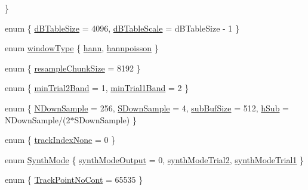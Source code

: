 \begin{DoxyCompactItemize}
 \}
\item 
enum \{ \hyperlink{namespace__sbsms___aa156b1bea560891fc580b9dca377bba0a8e2623f54fcf2f5a2d0552d731f6f146}{d\+B\+Table\+Size} = 4096, 
\hyperlink{namespace__sbsms___aa156b1bea560891fc580b9dca377bba0aac3733f2be1d01356fd6ada76bc62be0}{d\+B\+Table\+Scale} = d\+B\+Table\+Size -\/ 1
 \}
\item 
enum \hyperlink{namespace__sbsms___a62c9e6ed284aa8472274a48cccd777f1}{window\+Type} \{ \hyperlink{namespace__sbsms___a62c9e6ed284aa8472274a48cccd777f1a59da3b0b8fdeb25dac4eec9c53828d91}{hann}, 
\hyperlink{namespace__sbsms___a62c9e6ed284aa8472274a48cccd777f1ad5b7ad1b715cc9a6f75b8b74c4fe69a3}{hannpoisson}
 \}
\item 
enum \{ \hyperlink{namespace__sbsms___a63a4ac6396ce2a0b95d3fd234eb362fca71871c0b75ab2583bef18af369bd50a4}{resample\+Chunk\+Size} = 8192
 \}
\item 
enum \{ \hyperlink{namespace__sbsms___a79a0ca762d317030c29295cb20496a7da47f713a03ba9176eedce881edd4cdbdf}{min\+Trial2\+Band} = 1, 
\hyperlink{namespace__sbsms___a79a0ca762d317030c29295cb20496a7dad3d329f6ea1764f86f37427db90bdf46}{min\+Trial1\+Band} = 2
 \}
\item 
enum \{ \hyperlink{namespace__sbsms___a1074f2891e042ba40cfa1c793cee3e65a25ecb24fd92518a71a3eddc01338a887}{N\+Down\+Sample} = 256, 
\hyperlink{namespace__sbsms___a1074f2891e042ba40cfa1c793cee3e65ab0f9e22fc2bd4d17b42bd9b5ee84cc3f}{S\+Down\+Sample} = 4, 
\hyperlink{namespace__sbsms___a1074f2891e042ba40cfa1c793cee3e65ac1d0e1dd9f180285a3ef33a0bcc76fc8}{sub\+Buf\+Size} = 512, 
\hyperlink{namespace__sbsms___a1074f2891e042ba40cfa1c793cee3e65a1d7ff7dc7e17b7600724288e591d518f}{h\+Sub} = N\+Down\+Sample/(2$\ast$\+S\+Down\+Sample)
 \}
\item 
enum \{ \hyperlink{namespace__sbsms___aebffbcbc2857b24d969485e5446a6b42af925ccbf461ff83358bde6804b239055}{track\+Index\+None} = 0
 \}
\item 
enum \hyperlink{namespace__sbsms___aea7c2cadef128d5fe8bb8fae87c5b7b2}{Synth\+Mode} \{ \hyperlink{namespace__sbsms___aea7c2cadef128d5fe8bb8fae87c5b7b2ab64683b26bf56d98d414854c6b0ad4f8}{synth\+Mode\+Output} = 0, 
\hyperlink{namespace__sbsms___aea7c2cadef128d5fe8bb8fae87c5b7b2a1e1a04941af58dae56623c1e7238de3c}{synth\+Mode\+Trial2}, 
\hyperlink{namespace__sbsms___aea7c2cadef128d5fe8bb8fae87c5b7b2a9e16f3f415a08ff0e0c809d9e41869dd}{synth\+Mode\+Trial1}
 \}
\item 
enum \{ \hyperlink{namespace__sbsms___a2abd0705d3fc23d114fdc3e816fa26e3abd03732c0152d062794f26a7b81f2431}{Track\+Point\+No\+Cont} = 65535
 \}
\end{DoxyCompactItemize}
